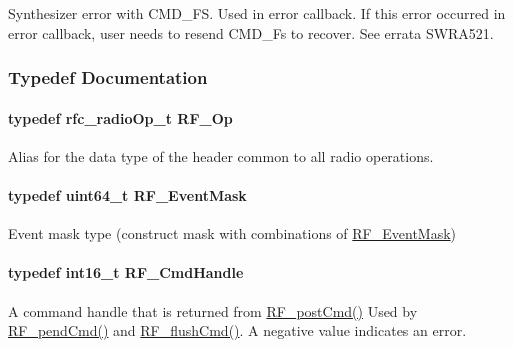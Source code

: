 Synthesizer error with C\+M\+D\+\_\+\+F\+S. Used in error callback. If this error occurred in error callback, user needs to resend C\+M\+D\+\_\+\+Fs to recover. See errata S\+W\+R\+A521. 



\subsubsection{Typedef Documentation}
\paragraph[{R\+F\+\_\+\+Op}]{\setlength{\rightskip}{0pt plus 5cm}typedef rfc\+\_\+radio\+Op\+\_\+t {\bf R\+F\+\_\+\+Op}}\label{_r_f_8h_a47ea3dea78019340e8f8ceb854de5f02}


Alias for the data type of the header common to all radio operations. 

\paragraph[{R\+F\+\_\+\+Event\+Mask}]{\setlength{\rightskip}{0pt plus 5cm}typedef uint64\+\_\+t {\bf R\+F\+\_\+\+Event\+Mask}}\label{_r_f_8h_a128c46e18dbbaa781abb7abafc35233a}


Event mask type (construct mask with combinations of \hyperlink{_r_f_8h_a128c46e18dbbaa781abb7abafc35233a}{R\+F\+\_\+\+Event\+Mask}) 

\paragraph[{R\+F\+\_\+\+Cmd\+Handle}]{\setlength{\rightskip}{0pt plus 5cm}typedef int16\+\_\+t {\bf R\+F\+\_\+\+Cmd\+Handle}}\label{_r_f_8h_acab1f56c62a9fd1ad0a91a46b6da23f1}


A command handle that is returned from \hyperlink{_r_f_8h_a2b0ee444fcb74917df94eefea804ecbb}{R\+F\+\_\+post\+Cmd()} Used by \hyperlink{_r_f_8h_a91c1cb2508311f822acbc08ace568a83}{R\+F\+\_\+pend\+Cmd()} and \hyperlink{_r_f_8h_ae3ff5c614f4a63cb4e79c90f9229149a}{R\+F\+\_\+flush\+Cmd()}. A negative value indicates an error. 

